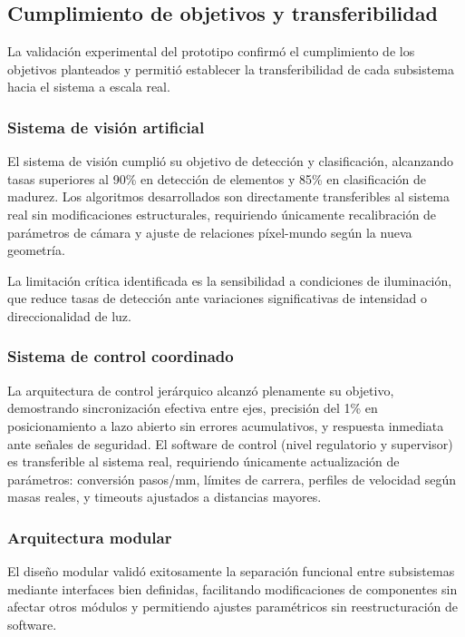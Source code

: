 \subsection{Cumplimiento de objetivos y transferibilidad}

La validación experimental del prototipo confirmó el cumplimiento de los objetivos planteados y permitió establecer la transferibilidad de cada subsistema hacia el sistema a escala real.

\subsubsection{Sistema de visión artificial}

El sistema de visión cumplió su objetivo de detección y clasificación, alcanzando tasas superiores al 90\% en detección de elementos y 85\% en clasificación de madurez. Los algoritmos desarrollados son directamente transferibles al sistema real sin modificaciones estructurales, requiriendo únicamente recalibración de parámetros de cámara y ajuste de relaciones píxel-mundo según la nueva geometría.

La limitación crítica identificada es la sensibilidad a condiciones de iluminación, que reduce tasas de detección ante variaciones significativas de intensidad o direccionalidad de luz.

\subsubsection{Sistema de control coordinado}

La arquitectura de control jerárquico alcanzó plenamente su objetivo, demostrando sincronización efectiva entre ejes, precisión del 1\% en posicionamiento a lazo abierto sin errores acumulativos, y respuesta inmediata ante señales de seguridad. El software de control (nivel regulatorio y supervisor) es transferible al sistema real, requiriendo únicamente actualización de parámetros: conversión pasos/mm, límites de carrera, perfiles de velocidad según masas reales, y timeouts ajustados a distancias mayores.

\subsubsection{Arquitectura modular}

El diseño modular validó exitosamente la separación funcional entre subsistemas mediante interfaces bien definidas, facilitando modificaciones de componentes sin afectar otros módulos y permitiendo ajustes paramétricos sin reestructuración de software.

